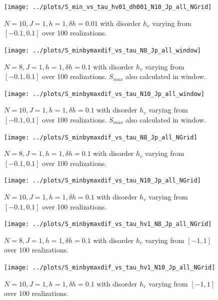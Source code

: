 \documentclass[a4paper]{article}
\begin{document}
\begin{figure}[h!]
  \centering
  \texttt{[image: ../plots/S\_min\_vs\_tau\_hv01\_dh001\_N10\_Jp\_all\_NGrid]}
  \caption{$N = 10, J = 1, h = 1, \delta h=0.01$ with disorder $h_v$ varying from $[-0.1,0.1]$ over 100 realizations.}
  \label{fig:}
\end{figure}

\begin{figure}[h!]
  \centering
  \texttt{[image: ../plots/S\_minbymaxdif\_vs\_tau\_N8\_Jp\_all\_window]}
  \caption{$N = 8, J = 1, h = 1, \delta h=0.1$ with disorder $h_v$ varying from $[-0.1,0.1]$ over 100 realizations. $S_{max}$ also calculated in window.}
  \label{fig:}
\end{figure}

\begin{figure}[h!]
  \centering
  \texttt{[image: ../plots/S\_minbymaxdif\_vs\_tau\_N10\_Jp\_all\_window]}
  \caption{$N = 10, J = 1, h = 1, \delta h=0.1$ with disorder $h_v$ varying from $[-0.1,0.1]$ over 100 realizations. $S_{max}$ also calculated in window.}
  \label{fig:}
\end{figure}

\begin{figure}[h!]
  \centering
  \texttt{[image: ../plots/S\_minbymaxdif\_vs\_tau\_N8\_Jp\_all\_NGrid]}
  \caption{$N = 8, J = 1, h = 1, \delta h=0.1$ with disorder $h_v$ varying from $[-0.1,0.1]$ over 100 realizations.}
  \label{fig:}
\end{figure}

\begin{figure}[h!]
  \centering
  \texttt{[image: ../plots/S\_minbymaxdif\_vs\_tau\_N10\_Jp\_all\_NGrid]}
  \caption{$N = 10, J = 1, h = 1, \delta h=0.1$ with disorder $h_v$ varying from $[-0.1,0.1]$ over 100 realizations.}
  \label{fig:}
\end{figure}

\begin{figure}[h!]
  \centering
  \texttt{[image: ../plots/S\_minbymaxdif\_vs\_tau\_hv1\_N8\_Jp\_all\_NGrid]}
  \caption{$N = 8, J = 1, h = 1, \delta h=0.1$ with disorder $h_v$ varying from $[-1,1]$ over 100 realizations.}
  \label{fig:}
\end{figure}

\begin{figure}[h!]
  \centering
  \texttt{[image: ../plots/S\_minbymaxdif\_vs\_tau\_hv1\_N10\_Jp\_all\_NGrid]}
  \caption{$N = 10, J = 1, h = 1, \delta h=0.1$ with disorder $h_v$ varying from $[-1,1]$ over 100 realizations.}
  \label{fig:}
\end{figure}
\end{document}
